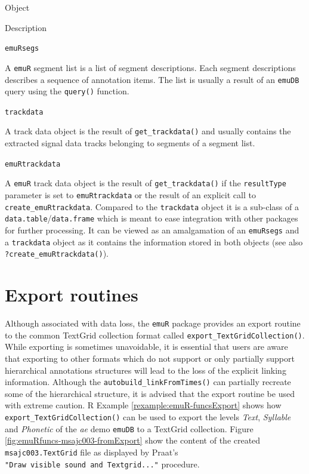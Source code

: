 \documentclass[]{book}
\theoremstyle{definition}
\theoremstyle{definition}
\theoremstyle{definition}
\theoremstyle{remark}
\begin{document}
Object

Description

\texttt{emuRsegs}

A \texttt{emuR} segment list is a list of segment descriptions. Each
segment descriptions describes a sequence of annotation items. The list
is usually a result of an \texttt{emuDB} query using the
\texttt{query()} function.

\texttt{trackdata}

A track data object is the result of \texttt{get\_trackdata()} and
usually contains the extracted signal data tracks belonging to segments
of a segment list.

\texttt{emuRtrackdata}

A \texttt{emuR} track data object is the result of
\texttt{get\_trackdata()} if the \texttt{resultType} parameter is set to
\texttt{emuRtrackdata} or the result of an explicit call to
\texttt{create\_emuRtrackdata}. Compared to the \texttt{trackdata}
object it is a sub-class of a \texttt{data.table}/\texttt{data.frame}
which is meant to ease integration with other packages for further
processing. It can be viewed as an amalgamation of an \texttt{emuRsegs}
and a \texttt{trackdata} object as it contains the information stored in
both objects (see also \texttt{?create\_emuRtrackdata()}).

\hypertarget{sec:emuRpackageDetails-exportRoutines}{%
\section{Export routines}\label{sec:emuRpackageDetails-exportRoutines}}

Although associated with data loss, the \texttt{emuR} package provides
an export routine to the common TextGrid collection format called
\texttt{export\_TextGridCollection()}. While exporting is sometimes
unavoidable, it is essential that users are aware that exporting to
other formats which do not support or only partially support
hierarchical annotations structures will lead to the loss of the
explicit linking information. Although the
\texttt{autobuild\_linkFromTimes()} can partially recreate some of the
hierarchical structure, it is advised that the export routine be used
with extreme caution. R Example \ref{rexample:emuR-funcsExport} shows
how \texttt{export\_TextGridCollection()} can be used to export the
levels \emph{Text}, \emph{Syllable} and \emph{Phonetic} of the \emph{ae}
demo \texttt{emuDB} to a TextGrid collection. Figure
\ref{fig:emuRfuncs-msajc003-fromExport} show the content of the created
\texttt{msajc003.TextGrid} file as displayed by Praat's
\texttt{"Draw\ visible\ sound\ and\ Textgrid..."} procedure.
\end{document}

